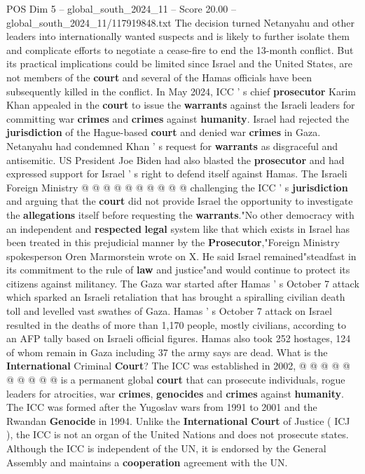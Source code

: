 \begin{textsample}{POS Dim 5 – global\_south\_2024\_11 – Score 20.00 – global\_south\_2024\_11/117919848.txt}
The decision turned Netanyahu and other leaders into internationally wanted suspects and is likely to further isolate them and complicate efforts to negotiate a cease-fire to end the 13-month conflict.
But its practical implications could be limited since Israel and the United States, are not members of the \textbf{court} and several of the Hamas officials have been subsequently killed in the conflict.
In May 2024, ICC ' s chief \textbf{prosecutor} Karim Khan appealed in the \textbf{court} to issue the \textbf{warrants} against the Israeli leaders for committing war \textbf{crimes} and \textbf{crimes} against \textbf{humanity}.
Israel had rejected the \textbf{jurisdiction} of the Hague-based \textbf{court} and denied war \textbf{crimes} in Gaza.
Netanyahu had condemned Khan ' s request for \textbf{warrants} as disgraceful and antisemitic.
US President Joe Biden had also blasted the \textbf{prosecutor} and had expressed support for Israel ' s right to defend itself against Hamas.
The Israeli Foreign Ministry @ @ @ @ @ @ @ @ @ @ challenging the ICC ' s \textbf{jurisdiction} and arguing that the \textbf{court} did not provide Israel the opportunity to investigate the \textbf{allegations} itself before requesting the \textbf{warrants}."No other democracy with an independent and \textbf{respected} \textbf{legal} system like that which exists in Israel has been treated in this prejudicial manner by the \textbf{Prosecutor},"Foreign Ministry spokesperson Oren Marmorstein wrote on X.
He said Israel remained"steadfast in its commitment to the rule of \textbf{law} and justice"and would continue to protect its citizens against militancy.
The Gaza war started after Hamas ' s October 7 attack which sparked an Israeli retaliation that has brought a spiralling civilian death toll and levelled vast swathes of Gaza.
Hamas ' s October 7 attack on Israel resulted in the deaths of more than 1,170 people, mostly civilians, according to an AFP tally based on Israeli official figures.
Hamas also took 252 hostages, 124 of whom remain in Gaza including 37 the army says are dead.
What is the \textbf{International} Criminal \textbf{Court}?
The ICC was established in 2002, @ @ @ @ @ @ @ @ @ @ is a permanent global \textbf{court} that can prosecute individuals, rogue leaders for atrocities, war \textbf{crimes}, \textbf{genocides} and \textbf{crimes} against \textbf{humanity}.
The ICC was formed after the Yugoslav wars from 1991 to 2001 and the Rwandan \textbf{Genocide} in 1994.
Unlike the \textbf{International} \textbf{Court} of Justice ( ICJ ), the ICC is not an organ of the United Nations and does not prosecute states.
Although the ICC is independent of the UN, it is endorsed by the General Assembly and maintains a \textbf{cooperation} agreement with the UN.

\end{textsample}
